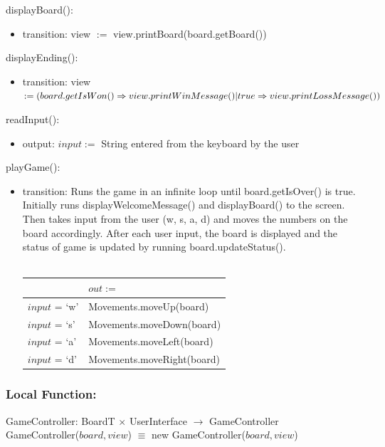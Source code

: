 \documentclass[12pt]{article}
\begin{document}
\noindent displayBoard():
\begin{itemize}
  \item transition: view $:=$ view.printBoard(board.getBoard())
\end{itemize}

\noindent displayEnding():
\begin{itemize}
  \item transition: view $:= (board.getIsWon() \Rightarrow view.printWinMessage() | \\ true \Rightarrow view.printLossMessage())$
\end{itemize}

\noindent readInput():
\begin{itemize}
  \item output: $input :=$ String entered from the keyboard by the user 
\end{itemize}

\noindent playGame():
\begin{itemize}
  \item transition: Runs the game in an infinite loop until board.getIsOver() is true. Initially runs displayWelcomeMessage() and displayBoard() to the screen. Then takes input from the user (w, s, a, d) and moves the numbers on the board accordingly. After each user input, the board is displayed and the status of game is updated by running board.updateStatus(). \\\\
  \begin{tabular}{| l | l |}
          \hline
          ~ & $out :=$ \\
          \hline
          $input$ = `w' & Movements.moveUp(board) \\
           \hline
          $input$ = `s' & Movements.moveDown(board) \\
           \hline
          $input$ = `a' & Movements.moveLeft(board) \\
           \hline
          $input$ = `d' & Movements.moveRight(board) \\
           \hline
        \end{tabular}
\end{itemize}


\subsubsection*{Local Function:}
GameController: BoardT $\times$ UserInterface $\rightarrow$ GameController \\
GameController($board, view$) $\equiv$ new GameController($board, view$)
\end{document}
